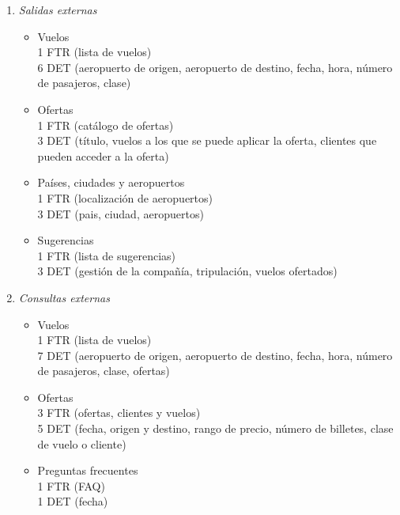 \begin{enumerate}
	\item \textit{Salidas externas}

		\begin{itemize}
			\item Vuelos \\
			1 FTR (lista de vuelos)\\
			6 DET (aeropuerto de origen, aeropuerto de destino, fecha, hora, número de pasajeros, clase)\\
			\item Ofertas \\
			1 FTR (catálogo de ofertas)\\
			3 DET (título, vuelos a los que se puede aplicar la oferta, clientes que pueden acceder a la oferta)\\
			\item Países, ciudades y aeropuertos \\
			1 FTR (localización de aeropuertos)\\
			3 DET (pais, ciudad, aeropuertos)\\
			\item Sugerencias \\
			1 FTR (lista de sugerencias)\\
			3 DET (gestión de la compañía, tripulación, vuelos ofertados)\\
		\end{itemize}

	\item \textit{Consultas externas}

		\begin{itemize}
			\item Vuelos \\
			1 FTR (lista de vuelos)\\
			7 DET (aeropuerto de origen, aeropuerto de destino, fecha, hora, número de pasajeros, clase, ofertas)\\
			\item Ofertas \\
			3 FTR (ofertas, clientes y vuelos)\\
			5 DET (fecha, origen y destino, rango de precio, número de billetes, clase de vuelo o cliente)\\
			\item Preguntas frecuentes \\
			1 FTR (FAQ)\\
			1 DET (fecha)\\
		\end{itemize}
	
\end{enumerate}
